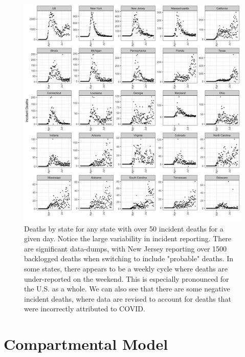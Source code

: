 \documentclass[11pt]{amsart}
\begin{document}
 \begin{figure}
     \centering
     \includegraphics[scale=.14]{data_plot.png}
     \caption{Deaths by state for any state with over 50 incident deaths for a given day. Notice the large variability in incident reporting. There are significant data-dumps, with New Jersey reporting over 1500 backlogged deaths when switching to include "probable" deaths. In some states, there appears to be a weekly cycle where deaths are under-reported on the weekend. This is especially pronounced for the U.S. as a whole. We can also see that there are some negative incident deaths, where data are revised to account for deaths that were incorrectly attributed to COVID. }
     \label{fig:data}
 \end{figure}
 
 \section{Compartmental Model}
\end{document}
